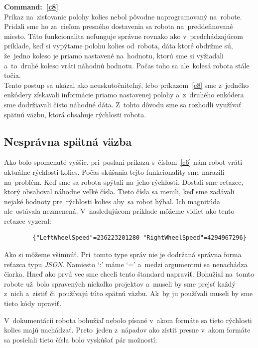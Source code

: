 \noindent \textbf{Command:~\ref{c8}} \\
\indent Príkaz na~zisťovanie polohy kolies nebol pôvodne naprogramovaný na~robote. Pridali sme ho za~cieľom presného
dostavenia sa robota na~preddefinované miesto. Táto funkcionalita nefunguje správne rovnako ako v~predchádzajúcom príklade,
keď si vypýtame polohu kolies od~robota, dáta ktoré obdržme sú, že~jedno koleso je priamo nastavené na~hodnotu, ktorú sme si
vyžiadali a~to~druhé koleso vráti náhodnú hodnotu. Počas toho sa ale~kolesá robota stále točia.\\

Tento postup sa ukázal ako neuskutočniteľný, lebo príkazom~\ref{c8} sme z~jedného enkódery
získavali informácie priamo nastavenej polohy a~z~druhého enkódera sme dodržiavali čisto náhodné dáta.
Z~tohto dôvodu sme sa rozhodli využívať spätnú väzbu, ktorá obsahuje rýchlosti robota.

\clearpage

\subsection{Nesprávna spätná väzba}
\label{subsec:wrongFeedback}

Ako bolo spomenuté vyššie, pri~poslaní príkazu s~číslom~\ref{c6} nám robot vráti aktuálne rýchlosti kolies. Počas skúšania tejto funkcionality
sme narazili na~problém. Keď sme sa robota spýtali na~jeho rýchlosti. Dostali sme reťazec, ktorý obsahoval náhodne veľké čísla. Tieto čísla sa
menili, keď sme zadávali nejaké hodnoty pre~rýchlosti kolies aby~sa robot hýbal. Ich magnitúda ale~ostávala nezmenená. V~nasledujúcom príklade
môžeme vidieť ako tento reťazec vyzeral:

\label{jsonWannabeSpeed}
\begin{lstlisting}
		{"LeftWheelSpeed"=236223201280 "RightWheelSpeed"=4294967296}
\end{lstlisting}

Ako si môžeme všimnúť. Pri~tomto type správ nie je dodržaná správna forma reťazca typu \textit{JSON}.
Namiesto `:' máme `=' a~medzi argumentmi sa nenachádza čiarka. Hneď ako prvú vec sme chceli tento štandard napraviť. Bohužiaľ na~tomto
robote už~bolo spravených niekoľko projektov a~museli by sme prejsť každý z~nich a~zistiť či~používajú túto spätnú väzbu. Ak~by ju používali
museli by sme tieto kódy upraviť.

V~dokumentácii robota bohužiaľ nebolo písané v~akom formáte sa tieto rýchlosti kolies majú nachádzať. Preto~jeden z~nápadov ako zistiť presne
v~akom formáte sa posielali tieto čísla bolo vyskúšať pár možností:

